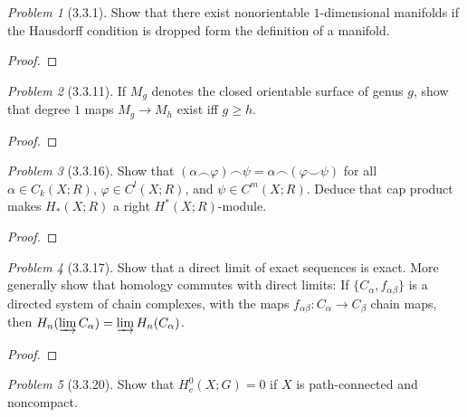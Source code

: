 \documentclass[10pt]{article}
\newcommand{\sk}{\vskip 10mm}
\theoremstyle{remark}
\newtheorem{problem}{Problem}
\begin{document}
\begin{problem}[3.3.1]
  Show that there exist nonorientable $1$-dimensional manifolds if the Hausdorff condition is dropped form the definition of a manifold.
\end{problem}

\begin{proof}
  
\end{proof}

\sk

\begin{problem}[3.3.11]
  If $M_g$ denotes the closed orientable surface of genus $g$, show that degree $1$ maps $M_g\rightarrow M_h$ exist iff $g\geq h$.
\end{problem}

\begin{proof}
  
\end{proof}

\sk

\begin{problem}[3.3.16]
  Show that $(\alpha\smallfrown \varphi)\smallfrown \psi=\alpha\smallfrown (\varphi\smallsmile \psi)$ for all $\alpha\in C_k(X;R)$, $\varphi\in C^l(X;R)$, and $\psi\in C^m(X;R)$. Deduce that cap product makes $H_*(X;R)$ a right $H^*(X;R)$-module.
\end{problem}

\begin{proof}
  
\end{proof}

\sk

\begin{problem}[3.3.17]
  Show that a direct limit of exact sequences is exact. More generally show that homology commutes with direct limits: If $\{C_\alpha,f_{\alpha\beta}\}$ is a directed system of chain complexes, with the maps $f_{\alpha\beta}:C_\alpha\rightarrow C_\beta$ chain maps, then $H_n(\varinjlim C_\alpha)=\varinjlim H_n(C_\alpha)$.
\end{problem}

\begin{proof}
  
\end{proof}

\sk

\begin{problem}[3.3.20]
  Show that $H_c^0(X;G)=0$ if $X$ is path-connected and noncompact.
\end{problem}
\end{document}
